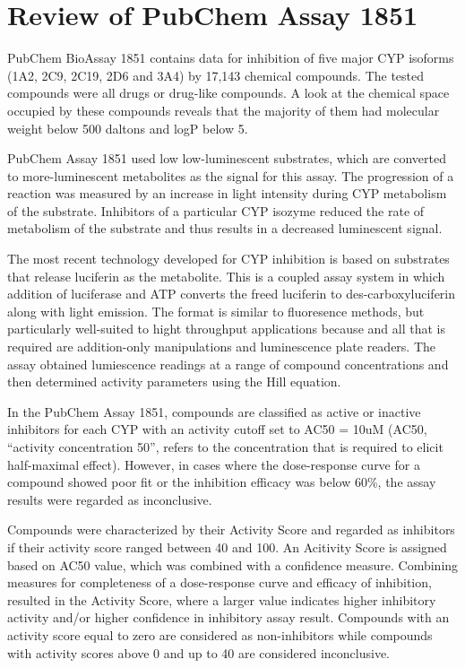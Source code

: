 \section{Review of PubChem Assay 1851}
  

PubChem BioAssay 1851 contains data for inhibition of five major CYP isoforms (1A2, 2C9, 2C19, 2D6 and 3A4) by 17,143 chemical compounds. \cite{Veith2009} The tested compounds were all drugs or drug-like compounds. A look at the chemical space occupied by these compounds reveals that the majority of them had molecular weight below 500 daltons and logP below 5. \cite{Lapins2013}

PubChem Assay 1851 used low low-luminescent substrates, which are converted to more-luminescent metabolites as the signal for this assay. The progression of a reaction was measured by an increase in light intensity during CYP metabolism of the substrate. Inhibitors of a particular CYP isozyme reduced the rate of metabolism of the substrate and thus results in a decreased luminescent signal. \cite{Zlokarnik2005}

The most recent technology developed for CYP inhibition is based on substrates that release luciferin as the metabolite. This is a coupled assay system in which addition of luciferase and ATP converts the freed luciferin to des-carboxyluciferin along with light emission. The format is similar to fluoresence methods, but particularly well-suited to hight throughput applications because and all that is required are addition-only manipulations and luminescence plate readers. \cite{Zlokarnik2005} The assay obtained lumiescence readings at a range of compound concentrations and then determined activity parameters using the Hill equation.

In the PubChem Assay 1851, compounds are classified as active or inactive inhibitors for each CYP with an activity cutoff set to AC50 = 10uM (AC50, “activity concentration 50”, refers to the concentration that is required to elicit half-maximal effect). However, in cases where the dose-response curve for a compound showed poor fit or the inhibition efficacy was below 60\%, the assay results were regarded as inconclusive. \cite{Veith2009}

Compounds were characterized by their Activity Score and regarded as inhibitors if their activity score ranged between 40 and 100. An Acitivity Score is assigned based on AC50 value, which was combined with a confidence measure. Combining measures for completeness of a dose-response curve and efficacy of inhibition, resulted in the Activity Score, where a larger value indicates higher inhibitory activity and/or higher confidence in inhibitory assay result. Compounds with an activity score equal to zero are considered as non-inhibitors while compounds with activity scores above 0 and up to 40 are considered inconclusive. \cite{Lapins2013}

